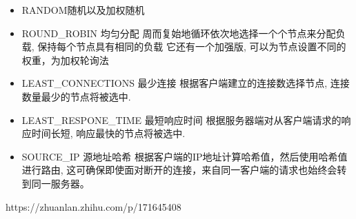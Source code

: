 \documentclass[../../../interview-questions.tex]{subfiles}
\begin{document}
\begin{itemize}
    \item{RANDOM随机以及加权随机}
    \item{ROUND\_ROBIN 均匀分配
    周而复始地循环依次地选择一个个节点来分配负载, 保持每个节点具有相同的负载
    它还有一个加强版, 可以为节点设置不同的权重，为加权轮询法}
    \item {LEAST\_CONNECTIONS 最少连接
    根据客户端建立的连接数选择节点, 连接数量最少的节点将被选中.}
    \item {LEAST\_RESPONE\_TIME 最短响应时间
    根据服务器端对从客户端请求的响应时间长短, 响应最快的节点将被选中.}
    \item {SOURCE\_IP 源地址哈希
    根据客户端的IP地址计算哈希值，然后使用哈希值进行路由, 这可确保即使面对断开的连接，来自同一客户端的请求也始终会转到同一服务器。}
\end{itemize}

https://zhuanlan.zhihu.com/p/171645408
\end{document}
